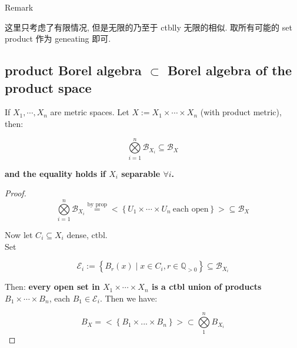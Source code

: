 \documentclass{qlnotes-export}
\begin{document}
\begin{qlremark}{Remark}

这里只考虑了有限情况, 但是无限的乃至于 ctblly 无限的相似. 取所有可能的 set product 作为 geneating 即可.

\end{qlremark}

\subsection{\texorpdfstring{product Borel algebra \(\subset\) Borel algebra of the product space}{product Borel algebra \textbackslash subset Borel algebra of the product space}}\label{product-borel-algebra-subset-borel-algebra-of-the-product-space}

\begin{proposition}\label{prop-06-product-measure-fubini-tonelli-proposition-002}

If \(X_{1},\cdots,X_{n}\) are metric spaces. Let \(X := X_{1} \times \cdots \times X_{n}\) (with product metric), then:

\[\bigotimes\limits_{i = 1}^{n}\mathcal{B}_{X_{i}} \subseteq \mathcal{B}_{X}\]

\textbf{and the equality holds if \(X_{i}\) separable \(\forall i\).}

\end{proposition}

\begin{proof}

\[\bigotimes\limits_{i = 1}^{n}\mathcal{B}_{X_{i}}\overset{\text{by prop}}{=} < \left\{ {U_{1} \times \cdots \times U_{n}\ \text{each open}} \right\} > \subseteq \mathcal{B}_{X}\]

Now let \(C_{i} \subseteq X_{i}\) dense, ctbl.\\
Set

\[\mathcal{E}_{i} := \left\{ {B_{r}(x) \mid x \in C_{i}, r \in {\mathbb{Q}}_{> 0}} \right\} \subseteq \mathcal{B}_{X_{i}}\]

Then: \textbf{every open set in \(X_{1} \times \cdots \times X_{n}\) is a ctbl union of products \(B_{1} \times \cdots \times B_{n}\)}, each \(B_{1} \in \mathcal{E}_{i}\). Then we have:

\[B_{X} = < \left\{ {B_{1} \times ... \times B_{n}} \right\} > \subset \bigotimes\limits_{1}^{n}B_{X_{i}}\]

\end{proof}
\end{document}
